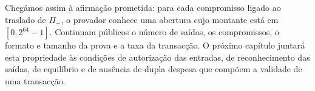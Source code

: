 Chegámos assim à afirmação prometida: para cada compromisso ligado ao traslado
de \(\Pi_+\), o provador conhece uma abertura cujo montante está em
\([0,2^{64}-1]\). Continuam públicos o número de saídas, os compromissos, o
formato e tamanho da prova e a taxa da transacção. O próximo capítulo juntará
esta propriedade às condições de autorização das entradas, de reconhecimento
das saídas, de equilíbrio e de ausência de dupla despesa que compõem a
validade de uma transacção.
